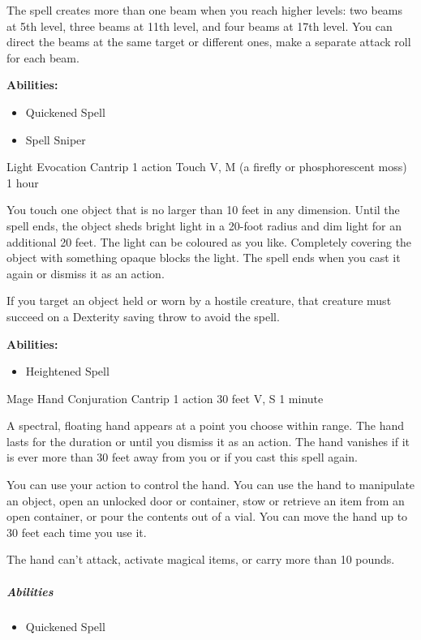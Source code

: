 \documentclass[a4paper,openany,twocolumn]{book}
\begin{document}
The spell creates more than one beam when you reach higher levels: two beams at 5th level, three beams at 11th level, and four beams at 17th level. You can direct the beams at the same target or different ones, make a separate attack roll for each beam.

\textbf{Abilities:}
\begin{itemize}
  \item Quickened Spell
  \item Spell Sniper
\end{itemize}

\DndSpellHeader
  {Light}
  {Evocation Cantrip}
  {1 action}
  {Touch}
  {V, M (a firefly or phosphorescent moss)}
  {1 hour}

You touch one object that is no larger than 10 feet in any dimension. Until the spell ends, the object sheds bright light in a 20-foot radius and dim light for an additional 20 feet. The light can be coloured as you like. Completely covering the object with something opaque blocks the light. The spell ends when you cast it again or dismiss it as an action.

If you target an object held or worn by a hostile creature, that creature must succeed on a Dexterity saving throw to avoid the spell.

\textbf{Abilities:}
\begin{itemize}
  \item Heightened Spell
\end{itemize}

\DndSpellHeader
  {Mage Hand}
  {Conjuration Cantrip}
  {1 action}
  {30 feet}
  {V, S}
  {1 minute}

A spectral, floating hand appears at a point you choose within range. The hand lasts for the duration or until you dismiss it as an action. The hand vanishes if it is ever more than 30 feet away from you or if you cast this spell again.
    
You can use your action to control the hand. You can use the hand to manipulate an object, open an unlocked door or container, stow or retrieve an item from an open container, or pour the contents out of a vial. You can move the hand up to 30 feet each time you use it.
    
The hand can't attack, activate magical items, or carry more than 10 pounds.

\subparagraph*{Abilities}
\begin{itemize}
  \item Quickened Spell
\end{itemize}
\end{document}
